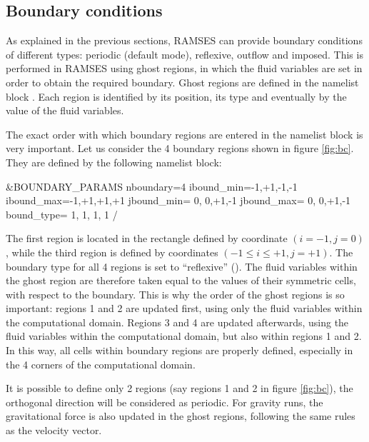 \subsection{Boundary conditions}
\label{sec:bc}

As explained in the previous sections, RAMSES can provide boundary conditions
of different types: periodic (default mode), reflexive, outflow and imposed.
This is performed in RAMSES using ghost regions, in which the fluid variables
are set in order to obtain the required boundary. Ghost regions are defined in
the namelist block . Each region is identified by
its position, its type and eventually by the value of the fluid variables. 

\begin{warning}
The exact order with which boundary regions are entered in the namelist block
is very important. Let us consider the 4 boundary regions shown in figure
\ref{fig:bc}. They are defined by the following namelist block:
%
\begin{Prompt}
&BOUNDARY_PARAMS
nboundary=4
ibound_min=-1,+1,-1,-1
ibound_max=-1,+1,+1,+1
jbound_min= 0, 0,+1,-1
jbound_max= 0, 0,+1,-1
bound_type= 1, 1, 1, 1
/
\end{Prompt}
%
The first region is located in the rectangle defined by coordinate
$(i=-1,j=0)$, while the third region is defined by coordinates $(-1 \leq i \leq
+1, j=+1)$. The boundary type for all 4 regions is set to ``reflexive''
(). The fluid variables within the ghost region
are therefore taken equal to the values of their symmetric cells, with respect
to the boundary. This is why the order of the ghost regions is so important:
regions 1 and 2 are updated first, using only the fluid variables within the
computational domain.  Regions 3 and 4 are updated afterwards, using the fluid
variables within the computational domain, but also within regions 1 and 2. In
this way, all cells within boundary regions are properly defined, especially in
the 4 corners of the computational domain.
\end{warning}

It is possible to define only 2 regions (say regions 1 and 2 in figure
\ref{fig:bc}), the orthogonal direction will be considered as periodic. For
gravity runs, the gravitational force is also updated in the ghost regions,
following the same rules as the velocity vector.

